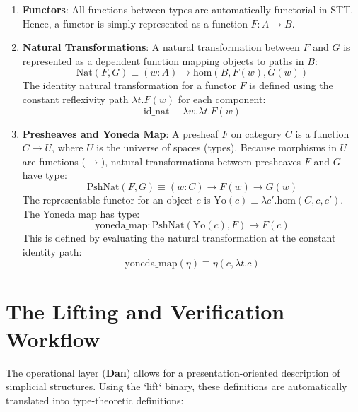 \documentclass[11pt]{article}
\newcommand{\homtype}[3]{\text{hom}(#1, #2, #3)}
\newcommand{\dan}[0]{\textbf{Dan}}
\begin{document}
\begin{enumerate}
    \item \textbf{Functors}: All functions between types are automatically functorial in STT. Hence, a functor is simply represented as a function $F : A \to B$.
    \item \textbf{Natural Transformations}: A natural transformation between $F$ and $G$ is represented as a dependent function mapping objects to paths in $B$:
    \begin{equation}
        \text{Nat}(F, G) \equiv (w : A) \to \homtype{B}{F(w)}{G(w)}
    \end{equation}
    The identity natural transformation for a functor $F$ is defined using the constant reflexivity path $\lambda t. F(w)$ for each component:
    \begin{equation}
        \text{id\_nat} \equiv \lambda w. \lambda t. F(w)
    \end{equation}
    \item \textbf{Presheaves and Yoneda Map}: A presheaf $F$ on category $C$ is a function $C \to U$, where $U$ is the universe of spaces (types). Because morphisms in $U$ are functions ($\to$), natural transformations between presheaves $F$ and $G$ have type:
    \begin{equation}
        \text{PshNat}(F, G) \equiv (w : C) \to F(w) \to G(w)
    \end{equation}
    The representable functor for an object $c$ is $\text{Yo}(c) \equiv \lambda c'. \homtype{C}{c}{c'}$. The Yoneda map has type:
    \begin{equation}
        \text{yoneda\_map} : \text{PshNat}(\text{Yo}(c), F) \to F(c)
    \end{equation}
    This is defined by evaluating the natural transformation at the constant identity path:
    \begin{equation}
        \text{yoneda\_map}(\eta) \equiv \eta(c, \lambda t. c)
    \end{equation}
\end{enumerate}

\section{The Lifting and Verification Workflow}

The operational layer (\dan{}) allows for a presentation-oriented description of simplicial structures. Using the `lift` binary, these definitions are automatically translated into type-theoretic definitions:
\end{document}
